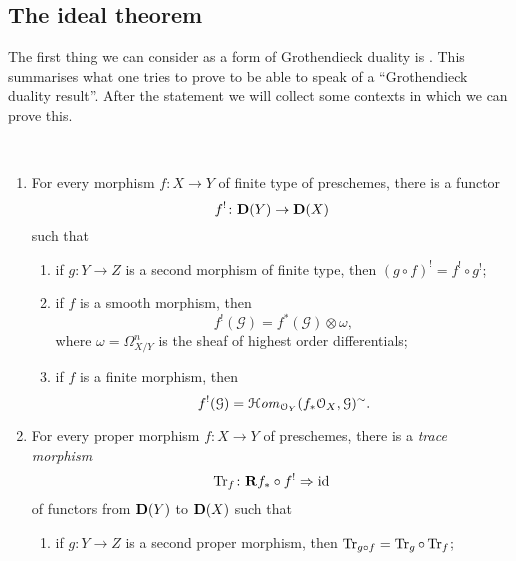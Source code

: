 \documentclass[10pt,a4paper]{article}
\begin{document}
\subsection{The ideal theorem}
The first thing we can consider as a form of Grothendieck duality is \cite[Ideal theorem on page 6]{hartshorne-residues-and-duality}. This summarises what one tries to prove to be able to speak of a ``Grothendieck duality result''. After the statement we will collect some contexts in which we can prove this.
\begin{theorem} {\ }
  \label{theorem:classical}
  \begin{enumerate}
    \item\label{enumerate:classical-a} For every morphism $f\colon X\to Y$ of finite type of preschemes, there is a functor
      \begin{equation}
        f^!\colon\mathbf{D}(Y)\to\mathbf{D}(X)
      \end{equation}
      such that
      \begin{enumerate}
        \item\label{enumerate:classical-a-1} if $g\colon Y\to Z$ is a second morphism of finite type, then $(g\circ f)^!=f^!\circ g^!$;
        \item\label{enumerate:classical-a-2} if $f$ is a smooth morphism, then
          \begin{equation}
            f^!(\mathcal{G})=f^*(\mathcal{G})\otimes\omega,
          \end{equation}
          where $\omega=\Omega_{X/Y}^n$ is the sheaf of highest order differentials;
        \item\label{enumerate:classical-a-3} if $f$ is a finite morphism, then
          \begin{equation}
            f^!(\mathcal{G})=\operatorname{\mathcal{H}\mathit{om}}_{\mathcal{O}_Y}(f_*\mathcal{O}_X,\mathcal{G})^\sim.
          \end{equation}
      \end{enumerate}
    \item\label{enumerate:classical-b} For every proper morphism $f\colon X\to Y$ of preschemes, there is a \emph{trace morphism}
      \begin{equation}
        \operatorname{Tr}_f\colon\mathbf{R} f_*\circ f^!\Rightarrow\mathrm{id}
      \end{equation}
      of functors from $\mathbf{D}(Y)$ to $\mathbf{D}(X)$ such that
      \begin{enumerate}
        \item\label{enumerate:classical-b-1} if $g\colon Y\to Z$ is a second proper morphism, then $\operatorname{Tr}_{g\circ f}=\operatorname{Tr}_g\circ\operatorname{Tr}_f$;

\end{enumerate}
\end{enumerate}
\end{theorem}
\end{document}
